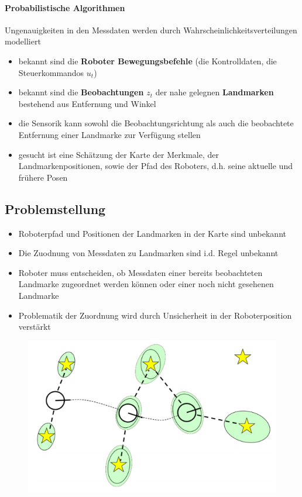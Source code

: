 \paragraph{Probabilistische Algorithmen}
Ungenauigkeiten in den Messdaten werden durch Wahrscheinlichkeitsverteilungen modelliert
\begin{itemize}
	\item bekannt sind die \textbf{Roboter Bewegungsbefehle} (die Kontrolldaten, die Steuerkommandos $u_t$)
	\item bekannt sind die \textbf{Beobachtungen} $z_t$ der nahe gelegnen \textbf{Landmarken} bestehend aus Entfernung und Winkel
	\item die Sensorik kann sowohl die Beobachtungsrichtung als auch die beobachtete Entfernung einer Landmarke zur Verfügung stellen
	\item gesucht ist eine Schätzung der Karte der Merkmale, der Landmarkenpositionen, sowie der Pfad des Roboters, d.h. seine aktuelle und frühere Posen
\end{itemize}
\subsection{Problemstellung}
\begin{itemize}
	\item Roboterpfad und Positionen der Landmarken in der Karte sind unbekannt
	\item Die Zuodnung von Messdaten zu Landmarken sind i.d. Regel unbekannt
	\item Roboter muss entscheiden, ob Messdaten einer bereits beobachteten Landmarke zugeordnet werden können oder einer noch nicht gesehenen Landmarke
	\item Problematik der Zuordnung wird durch Unsicherheit in der Roboterposition verstärkt
\end{itemize}
\begin{figure}[H]
	\begin{center}
		\includegraphics[scale=0.5]{Resources/PNG/ProbabilisitischeLandmarken.PNG}
		\caption{}
		\label{fig:PNG/ProbabilistischeLandmarken.PNG}
	\end{center}
\end{figure}
